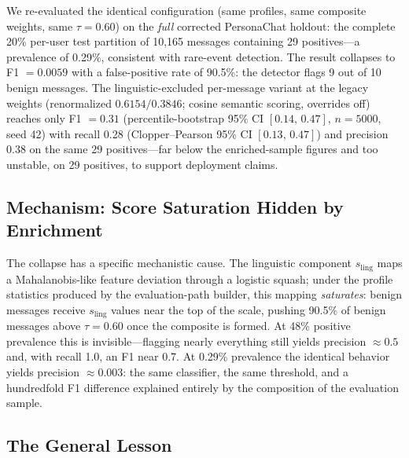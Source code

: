 \documentclass[conference]{IEEEtran}
\newcommand{\ling}{s_{\mathrm{ling}}}
\begin{document}
We re-evaluated the identical configuration (same profiles, same composite weights,
same $\tau{=}0.60$) on the \emph{full} corrected PersonaChat holdout: the complete
20\% per-user test partition of 10{,}165 messages containing 29 positives---a
prevalence of 0.29\%, consistent with rare-event detection.
The result collapses to F1 $= 0.0059$ with a false-positive rate of 90.5\%:
the detector flags 9 out of 10 benign messages.
The linguistic-excluded per-message variant at the legacy weights (renormalized
$0.6154/0.3846$; cosine semantic scoring, overrides off) reaches only
F1 $= 0.31$ (percentile-bootstrap 95\% CI $[0.14,\,0.47]$, $n{=}5000$, seed 42) with recall
0.28 (Clopper--Pearson 95\% CI $[0.13,\,0.47]$) and precision 0.38 on the same 29
positives---far below the enriched-sample figures and too unstable, on 29 positives,
to support deployment claims.

\subsection{Mechanism: Score Saturation Hidden by Enrichment}
\label{sec:baserate:mechanism}

The collapse has a specific mechanistic cause.
The linguistic component $\ling$ maps a Mahalanobis-like feature deviation through a
logistic squash; under the profile statistics produced by the evaluation-path
builder, this mapping \emph{saturates}: benign messages receive $\ling$ values near
the top of the scale, pushing 90.5\% of benign messages above $\tau{=}0.60$ once the
composite is formed.
At 48\% positive prevalence this is invisible---flagging nearly everything still
yields precision $\approx 0.5$ and, with recall 1.0, an F1 near 0.7.
At 0.29\% prevalence the identical behavior yields precision $\approx 0.003$: the
same classifier, the same threshold, and a hundredfold F1 difference explained
entirely by the composition of the evaluation sample.

\subsection{The General Lesson}
\label{sec:baserate:lesson}
\end{document}
